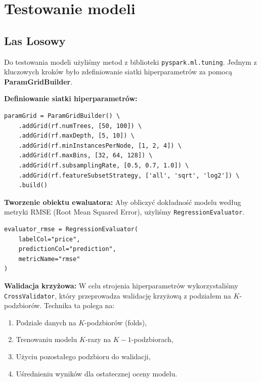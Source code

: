 \documentclass[12pt, a4paper]{report}
\begin{document}
\section{Testowanie modeli}

\subsection{Las Losowy}

\noindent Do testowania modeli użyliśmy metod z biblioteki \texttt{pyspark.ml.tuning}.  
Jednym z kluczowych kroków było zdefiniowanie siatki hiperparametrów za pomocą \textbf{ParamGridBuilder}.

\vspace{0.5em}

\noindent \textbf{Definiowanie siatki hiperparametrów:}
\begin{lstlisting}[caption={Siatka hiperparametrów dla modelu}]
paramGrid = ParamGridBuilder() \
    .addGrid(rf.numTrees, [50, 100]) \
    .addGrid(rf.maxDepth, [5, 10]) \
    .addGrid(rf.minInstancesPerNode, [1, 2, 4]) \
    .addGrid(rf.maxBins, [32, 64, 128]) \
    .addGrid(rf.subsamplingRate, [0.5, 0.7, 1.0]) \
    .addGrid(rf.featureSubsetStrategy, ['all', 'sqrt', 'log2']) \
    .build()
\end{lstlisting}

\vspace{1em}

\noindent \textbf{Tworzenie obiektu ewaluatora:}  
Aby obliczyć dokładność modelu według metryki RMSE (Root Mean Squared Error), użyliśmy \texttt{RegressionEvaluator}.

\begin{lstlisting}[caption={Ewaluator dla metryki RMSE}]
evaluator_rmse = RegressionEvaluator(
    labelCol="price",
    predictionCol="prediction",
    metricName="rmse"
)
\end{lstlisting}

\vspace{1em}

\noindent \textbf{Walidacja krzyżowa:}  
W celu strojenia hiperparametrów wykorzystaliśmy \texttt{CrossValidator}, który przeprowadza walidację krzyżową z podziałem na \( K \)-podzbiorów.  
Technika ta polega na:
\begin{enumerate}
    \item Podziale danych na \( K \)-podzbiorów (folds),
    \item Trenowaniu modelu \( K \)-razy na \( K-1 \)-podzbiorach,
    \item Użyciu pozostałego podzbioru do walidacji,
    \item Uśrednieniu wyników dla ostatecznej oceny modelu.
\end{enumerate}
\end{document}
